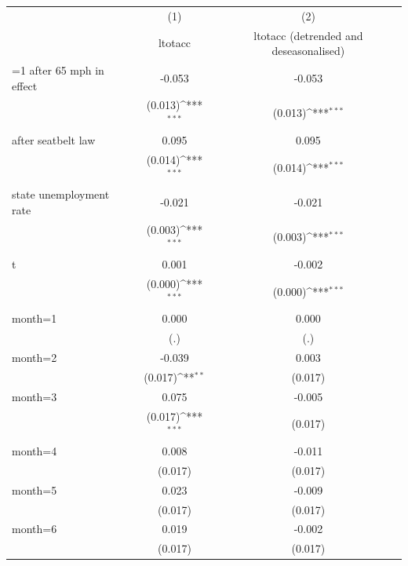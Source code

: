 \documentclass[11pt]{article}
\begin{document}
{
\def\sym#1{\ifmmode^{#1}\else\(^{#1}\)\fi}
\begin{tabular}{l*{2}{c}}
\toprule
                    &\multicolumn{1}{c}{(1)}&\multicolumn{1}{c}{(2)}\\
                    &\multicolumn{1}{c}{ltotacc}&\multicolumn{1}{c}{ltotacc (detrended and deseasonalised)}\\
\midrule
=1 after 65 mph in effect&      -0.053         &      -0.053         \\
                    &     (0.013)\sym{***}&     (0.013)\sym{***}\\
\addlinespace
=1 after seatbelt law&       0.095         &       0.095         \\
                    &     (0.014)\sym{***}&     (0.014)\sym{***}\\
\addlinespace
state unemployment rate&      -0.021         &      -0.021         \\
                    &     (0.003)\sym{***}&     (0.003)\sym{***}\\
\addlinespace
t                   &       0.001         &      -0.002         \\
                    &     (0.000)\sym{***}&     (0.000)\sym{***}\\
\addlinespace
month=1             &       0.000         &       0.000         \\
                    &         (.)         &         (.)         \\
\addlinespace
month=2             &      -0.039         &       0.003         \\
                    &     (0.017)\sym{**} &     (0.017)         \\
\addlinespace
month=3             &       0.075         &      -0.005         \\
                    &     (0.017)\sym{***}&     (0.017)         \\
\addlinespace
month=4             &       0.008         &      -0.011         \\
                    &     (0.017)         &     (0.017)         \\
\addlinespace
month=5             &       0.023         &      -0.009         \\
                    &     (0.017)         &     (0.017)         \\
\addlinespace
month=6             &       0.019         &      -0.002         \\
                    &     (0.017)         &     (0.017)         \\

\end{tabular}}
\end{document}
